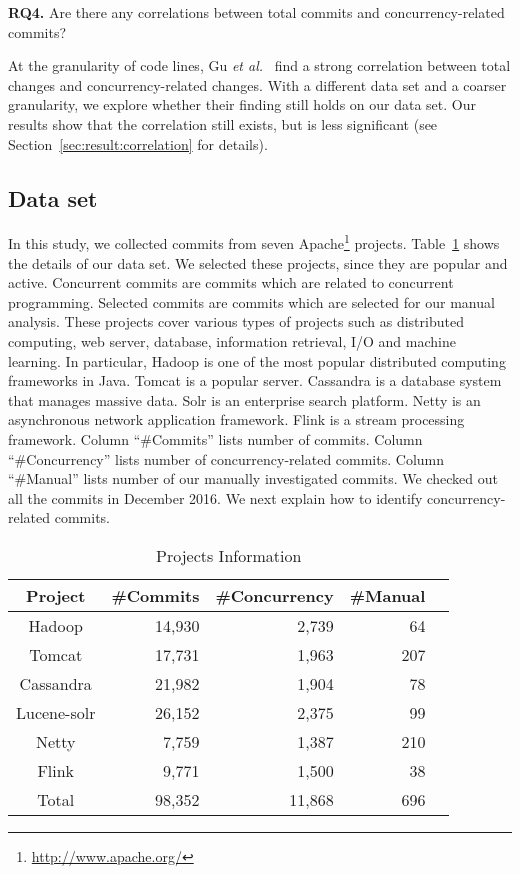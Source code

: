 \textbf{RQ4.} Are there any correlations between total commits and concurrency-related commits?

At the granularity of code lines, Gu \emph{et al.}~\cite{conf/sigsoft/GuJSZL15} find a strong correlation between total changes and concurrency-related changes. With a different data set and a coarser granularity, we explore whether their finding still holds on our data set. Our results show that the correlation still exists, but is less significant (see Section~\ref{sec:result:correlation} for details).

\subsection{Data set}
\label{sec:method:data}
In this study, we collected commits from seven Apache\footnote{\url{http://www.apache.org/}} projects. Table~\ref{table:dataset} shows the details of our data set. We selected these projects, since they are popular and active. Concurrent commits are commits which are related to concurrent programming. Selected commits are commits which are selected for our manual analysis. These projects cover various types of projects such as distributed computing, web server, database, information retrieval, I/O and machine learning. In particular, Hadoop is one of the most popular distributed computing frameworks in Java. Tomcat is a popular server. Cassandra is a database system that manages massive data. Solr is an enterprise search platform. Netty is an asynchronous network application framework. Flink is a stream processing framework. Column ``\#Commits'' lists number of commits. Column ``\#Concurrency'' lists number of concurrency-related commits. Column ``\#Manual'' lists number of our manually investigated commits. We checked out all the commits in December 2016. We next explain how to identify concurrency-related commits.

\begin{table}
	\centering
	\caption{Projects Information}
    \label{table:dataset}
	\begin{tabular}{|c|r|r|r|r|}\hline
		Project&\#Commits&\#Concurrency&\#Manual\\\hline
		Hadoop&14,930&2,739&64\\
		Tomcat&17,731&1,963&207\\
		Cassandra&21,982&1,904&78\\
		Lucene-solr&26,152&2,375&99\\
		Netty&7,759&1,387&210\\
		Flink&9,771&1,500&38\\\hline
		Total&98,352&11,868&696\\\hline
	\end{tabular}
\end{table}

